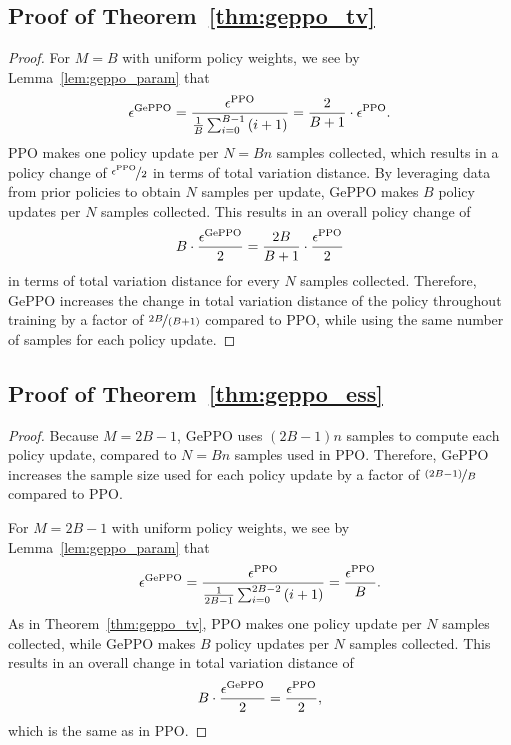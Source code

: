 \documentclass{article}
\begin{document}
\subsection{Proof of Theorem~\ref{thm:geppo_tv}}

\begin{proof}
For $M=B$ with uniform policy weights, we see by Lemma~\ref{lem:geppo_param} that
\begin{equation}
\epsilon^{\textnormal{GePPO}} = \frac{\epsilon^{\textnormal{PPO}}}{ \frac{1}{B} \sum_{i=0}^{B-1} \left( i + 1 \right)} = \frac{2}{B+1} \cdot \epsilon^{\textnormal{PPO}}.
\end{equation}
PPO makes one policy update per $N=Bn$ samples collected, which results in a policy change of $\nicefrac{\epsilon^{\textnormal{PPO}}}{2}$ in terms of total variation distance. By leveraging data from prior policies to obtain $N$ samples per update, GePPO makes $B$ policy updates per $N$ samples collected. This results in an overall policy change of
\begin{equation}
B \cdot \frac{\epsilon^{\textnormal{GePPO}}}{2} = \frac{2B}{B+1} \cdot \frac{\epsilon^{\textnormal{PPO}}}{2}
\end{equation}
in terms of total variation distance for every $N$ samples collected. Therefore, GePPO increases the change in total variation distance of the policy throughout training by a factor of $\nicefrac{2B}{(B+1)}$ compared to PPO, while using the same number of samples for each policy update.
\end{proof}

\subsection{Proof of Theorem~\ref{thm:geppo_ess}}

\begin{proof}
Because $M = 2B-1$, GePPO uses $(2B-1)n$ samples to compute each policy update, compared to $N=Bn$ samples used in PPO. Therefore, GePPO increases the sample size used for each policy update by a factor of $\nicefrac{(2B-1)}{B}$ compared to PPO.

For $M=2B-1$ with uniform policy weights, we see by Lemma~\ref{lem:geppo_param} that
\begin{equation}
\epsilon^{\textnormal{GePPO}} = \frac{\epsilon^{\textnormal{PPO}}}{ \frac{1}{2B-1} \sum_{i=0}^{2B-2} \left( i + 1 \right)} = \frac{\epsilon^{\textnormal{PPO}}}{B}.
\end{equation}
As in Theorem~\ref{thm:geppo_tv}, PPO makes one policy update per $N$ samples collected, while GePPO makes $B$ policy updates per $N$ samples collected. This results in an overall change in total variation distance of
\begin{equation}
B \cdot \frac{\epsilon^{\textnormal{GePPO}}}{2} = \frac{\epsilon^{\textnormal{PPO}}}{2},
\end{equation}
which is the same as in PPO.
\end{proof}
\end{document}
